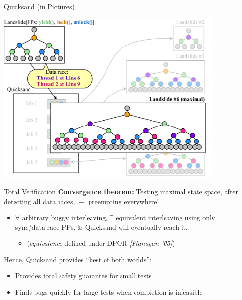 \documentclass[xcolor=dvipsnames]{beamer}
\begin{document}
\begin{frame}{Quicksand (in Pictures)}
	\begin{center}
	\vspace{-0.88em}
	\includegraphics[width=0.86\textwidth]{dr-jobs-maximal.pdf}
	\end{center}
\end{frame}


\begin{frame}{Total Verification}
	\textbf{Convergence theorem:} Testing maximal state space, after detecting all data races, $\equiv$ preempting everywhere!
	\begin{itemize}
		\item $\forall$ arbitrary buggy interleaving, $\exists$ equivalent interleaving %
			using only sync/data-race PPs, \& Quicksand will eventually reach it.
			\begin{itemize}
				\item ({\em equivalence} defined under DPOR {\em [Flanagan '05]})
			\end{itemize}
	\end{itemize}
	\linegap

	Hence, Quicksand provides ``best of both worlds'':
	\begin{itemize}
		\item Provides total safety guarantee for small tests
		\item Finds bugs quickly for large tests when completion is infeasible
	\end{itemize}
\end{frame}
\end{document}

